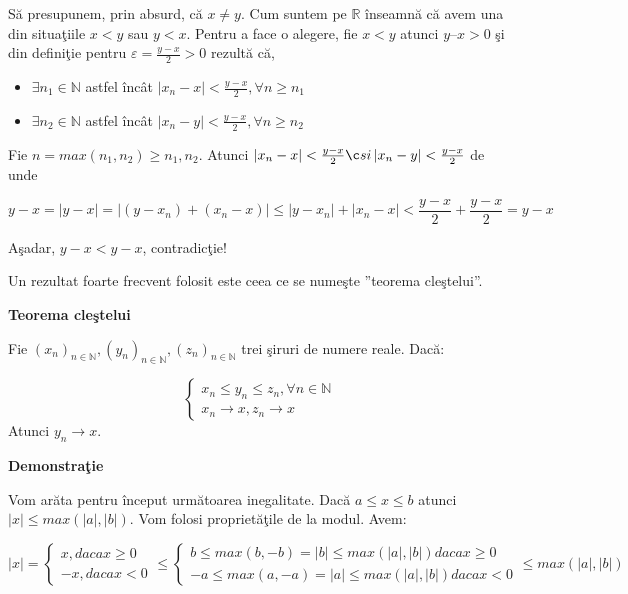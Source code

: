 \documentclass[a4paper,12pt,oneside]{report}
\begin{document}
S\u a presupunem, prin absurd, c\u a \(x \neq  y\). Cum suntem pe \(\mathbb{R}\) \^ inseamn\u a c\u a avem una din situa\c tiile \(x < y\) sau \(y < x\). Pentru a face o alegere, fie \(x < y\) atunci \(y – x > 0\) \c si din defini\c tie pentru \(\varepsilon = \frac{y- x}{2}  > 0\) rezult\u a c\u a, 

\begin{itemize}
  \item \(\exists  n_{1} \in \mathbb{N}\) astfel \^ inc\^ at \(\left | x_{n} - x  \right | < \frac{y - x }{2} , \forall n \geq n_{1} \)
  \item \(\exists  n_{2} \in \mathbb{N}\) astfel \^ inc\^ at \(\left | x_{n} - y  \right | < \frac{y - x }{2} , \forall n \geq n_{2} \)
\end{itemize}

Fie \(n = max (n _{1}, n_{2}) \geq n_{1}, n_{2}.\) Atunci \(\left | x_{n} - x \right | < \frac{y-x}{2} \c si \left | x_{n} - y  \right | <  \frac{y-x}{2}\) de unde 

\begin{displaymath}
  y-x = \left | y-x \right | = \left | (y-x_{n})+ (x_{n} -x) \right |\leq \left | y-x_{n} \right | + \left | x_{n} - x \right | < \frac{y-x}{2} + \frac{y-x}{2} = y-x
\end{displaymath}


A\c sadar, \(y-x < y-x\), contradic\c tie!

Un rezultat foarte frecvent folosit este ceea ce se nume\c ste ”teorema cle\c stelui”.

\textbf{Teorema cle\c stelui}

Fie \((x_{n})_{n\in \mathbb{N}}, (y_{n})_{n\in \mathbb{N}},(z_{n})_{n\in \mathbb{N}} \) trei \c siruri de numere reale. 
Dac\u a:

\[\left\{\begin{matrix}
x_{n} \leq  y_{n} \leq z_{n}, \forall  n \in \mathbb{N}\\ 
x_{n} \to x, z_{n} \rightarrow x

\end{matrix}\right. \]
Atunci \(y_{n} \to x\).

\textbf{Demonstra\c tie}

Vom ar\u ata pentru \^ inceput urm\u atoarea inegalitate. Dac\u a \(a \leq x\leq b\) atunci \(\left | x \right | \leq  max (\left | a \right |, \left | b \right |) \). 
Vom folosi propriet\u a\c tile de la modul. Avem:

\begin{displaymath}
  \left | x \right | = \left\{\begin{matrix} x, daca x \geq 0\\ -x, daca x< 0 \end{matrix}\right. \leq \left\{\begin{matrix} b\leq max(b,-b) = \left | b \right |\leq max(\left | a \right |,\left | b \right |) daca x\geq 0\\  -a\leq max(a,-a) = \left | a \right | \leq max (\left | a \right |,\left | b \right |) daca x< 0 \end{matrix}\right. \leq max (\left | a \right |, \left | b \right |)
\end{displaymath}
 
\end{document}
